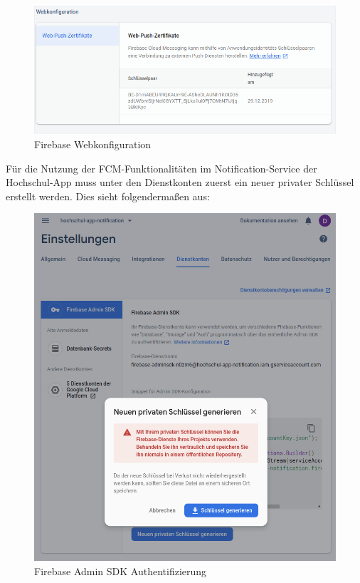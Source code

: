 
\begin{figure}[H]
\centering
\includegraphics[width=\pictureWidth cm + 2 cm]{Bilder/Kapitel_4/firebase_webkonfiguration.png}
\caption{Firebase Webkonfiguration\label{fig:fcmwebconfig}}
\end{figure}

Für die Nutzung der \ac{FCM}-Funktionalitäten im Notification-Service der Hochschul-\ac{App} muss unter den Dienstkonten zuerst ein neuer privater Schlüssel erstellt werden. Dies sieht folgendermaßen aus:

\begin{figure}[H]
\centering
\includegraphics[width=\pictureWidth cm + 2 cm]{Bilder/Kapitel_4/fcm_privatekey.png}
\caption{Firebase Admin SDK Authentifizierung\label{fig:fcmprivatkey}}
\end{figure}

